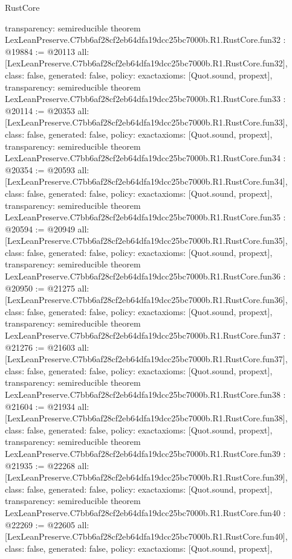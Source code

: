 \begin{lexlean}{RustCore}
\begin{coremodule}
{  transparency: semireducible
}
theorem LexLeanPreserve.C7bb6af28cf2eb64dfa19dcc25bc7000b.R1.RustCore.fun32 : @19884 := @20113 {
  all: [LexLeanPreserve.C7bb6af28cf2eb64dfa19dcc25bc7000b.R1.RustCore.fun32],
  class: false,
  generated: false,
  policy: exact{axioms: [Quot.sound, propext]},
  transparency: semireducible
}
theorem LexLeanPreserve.C7bb6af28cf2eb64dfa19dcc25bc7000b.R1.RustCore.fun33 : @20114 := @20353 {
  all: [LexLeanPreserve.C7bb6af28cf2eb64dfa19dcc25bc7000b.R1.RustCore.fun33],
  class: false,
  generated: false,
  policy: exact{axioms: [Quot.sound, propext]},
  transparency: semireducible
}
theorem LexLeanPreserve.C7bb6af28cf2eb64dfa19dcc25bc7000b.R1.RustCore.fun34 : @20354 := @20593 {
  all: [LexLeanPreserve.C7bb6af28cf2eb64dfa19dcc25bc7000b.R1.RustCore.fun34],
  class: false,
  generated: false,
  policy: exact{axioms: [Quot.sound, propext]},
  transparency: semireducible
}
theorem LexLeanPreserve.C7bb6af28cf2eb64dfa19dcc25bc7000b.R1.RustCore.fun35 : @20594 := @20949 {
  all: [LexLeanPreserve.C7bb6af28cf2eb64dfa19dcc25bc7000b.R1.RustCore.fun35],
  class: false,
  generated: false,
  policy: exact{axioms: [Quot.sound, propext]},
  transparency: semireducible
}
theorem LexLeanPreserve.C7bb6af28cf2eb64dfa19dcc25bc7000b.R1.RustCore.fun36 : @20950 := @21275 {
  all: [LexLeanPreserve.C7bb6af28cf2eb64dfa19dcc25bc7000b.R1.RustCore.fun36],
  class: false,
  generated: false,
  policy: exact{axioms: [Quot.sound, propext]},
  transparency: semireducible
}
theorem LexLeanPreserve.C7bb6af28cf2eb64dfa19dcc25bc7000b.R1.RustCore.fun37 : @21276 := @21603 {
  all: [LexLeanPreserve.C7bb6af28cf2eb64dfa19dcc25bc7000b.R1.RustCore.fun37],
  class: false,
  generated: false,
  policy: exact{axioms: [Quot.sound, propext]},
  transparency: semireducible
}
theorem LexLeanPreserve.C7bb6af28cf2eb64dfa19dcc25bc7000b.R1.RustCore.fun38 : @21604 := @21934 {
  all: [LexLeanPreserve.C7bb6af28cf2eb64dfa19dcc25bc7000b.R1.RustCore.fun38],
  class: false,
  generated: false,
  policy: exact{axioms: [Quot.sound, propext]},
  transparency: semireducible
}
theorem LexLeanPreserve.C7bb6af28cf2eb64dfa19dcc25bc7000b.R1.RustCore.fun39 : @21935 := @22268 {
  all: [LexLeanPreserve.C7bb6af28cf2eb64dfa19dcc25bc7000b.R1.RustCore.fun39],
  class: false,
  generated: false,
  policy: exact{axioms: [Quot.sound, propext]},
  transparency: semireducible
}
theorem LexLeanPreserve.C7bb6af28cf2eb64dfa19dcc25bc7000b.R1.RustCore.fun40 : @22269 := @22605 {
  all: [LexLeanPreserve.C7bb6af28cf2eb64dfa19dcc25bc7000b.R1.RustCore.fun40],
  class: false,
  generated: false,
  policy: exact{axioms: [Quot.sound, propext]},
}
\end{coremodule}
\end{lexlean}
